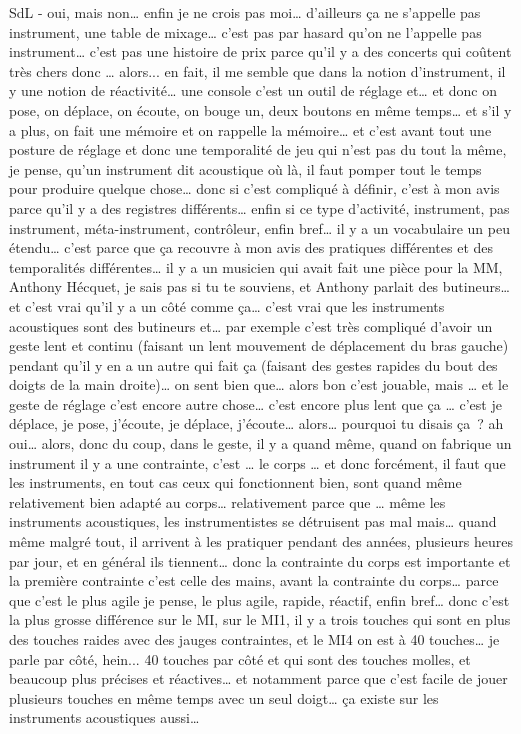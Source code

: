 SdL - oui, mais non… enfin je ne crois pas moi… d'ailleurs ça ne s'appelle pas instrument, une table de mixage… c'est pas par hasard qu'on ne l'appelle pas instrument… c'est pas une histoire de prix parce qu'il y a des concerts qui coûtent très chers donc … alors... en fait, il me semble que dans la notion d'instrument, il y une notion de réactivité… une console c'est un outil de réglage et… et donc on pose, on déplace,  on écoute, on bouge un, deux boutons en même temps… et s'il y a plus, on fait une mémoire et on rappelle la mémoire… et c'est avant tout une posture de réglage et donc une temporalité de jeu qui n'est pas du tout la même, je pense, qu'un instrument dit acoustique où là, il faut pomper tout le temps pour produire quelque chose… donc si c'est compliqué à définir, c'est à mon avis parce qu'il y a des registres différents… enfin si ce type d'activité, instrument, pas instrument, méta-instrument, contrôleur, enfin bref… il y a un vocabulaire un peu étendu… c'est parce que ça recouvre à mon avis des pratiques différentes et des temporalités différentes… il y a un musicien qui avait fait une pièce pour la MM, Anthony Hécquet, je sais pas si tu te souviens, et Anthony parlait des butineurs… et c'est vrai qu'il y a un côté comme ça… c'est vrai que les instruments acoustiques sont des butineurs et… par exemple c'est très compliqué d'avoir un geste lent et continu (faisant un lent mouvement de déplacement du bras gauche) pendant qu'il y en a un autre qui fait ça (faisant des gestes rapides du bout des doigts de la main droite)… on sent bien que… alors bon c'est jouable, mais … et le geste de réglage c'est encore autre chose… c'est encore plus lent que ça … c'est je déplace, je pose, j'écoute, je déplace, j'écoute… alors… pourquoi tu disais ça ? ah oui… alors, donc du coup, dans le geste, il y a quand même, quand on fabrique un instrument il y a une contrainte, c'est … le corps … et donc forcément, il faut que les instruments, en tout cas ceux qui fonctionnent bien, sont quand même relativement bien adapté au corps… relativement parce que … même les instruments acoustiques, les instrumentistes se détruisent pas mal mais… quand même malgré tout, il arrivent à les pratiquer pendant des années, plusieurs heures par jour, et en général ils tiennent… donc la contrainte du corps est importante et la première contrainte c'est celle des mains, avant la contrainte du corps… parce que c'est le plus agile je pense, le plus agile, rapide, réactif, enfin bref… donc c'est la plus grosse différence sur le MI, sur le MI1, il y a trois touches qui sont en plus des touches raides avec des jauges contraintes, et le MI4 on est à 40 touches… je parle par côté, hein... 40 touches par côté et qui sont des touches molles, et beaucoup plus précises et réactives… et notamment parce que c'est facile de jouer plusieurs touches en même temps avec un seul doigt… ça existe sur les instruments acoustiques aussi… 

